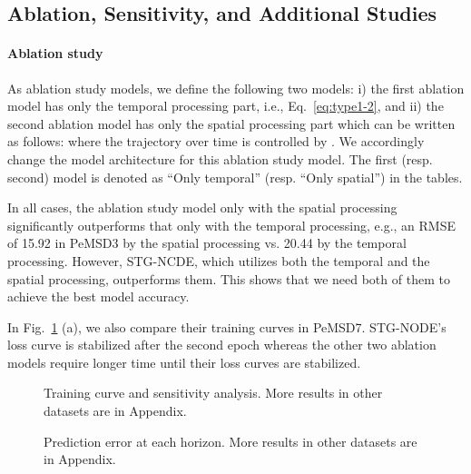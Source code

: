 \documentclass[letterpaper]{article} \usepackage{aaai22}  \usepackage{times}  \usepackage{helvet}  \usepackage{courier}  \usepackage[hyphens]{url}  \usepackage{graphicx} \urlstyle{rm} \def\UrlFont{\rm}  \usepackage{natbib}  \usepackage{caption} \DeclareCaptionStyle{ruled}{labelfont=normalfont,labelsep=colon,strut=off} \frenchspacing  \setlength{\pdfpagewidth}{8.5in}  \setlength{\pdfpageheight}{11in}  \usepackage{stfloats}
\begin{document}
\subsection{Ablation, Sensitivity, and Additional Studies}\label{sec:abl}
\paragraph{Ablation study} As ablation study models, we define the following two models: i) the first ablation model has only the temporal processing part, i.e., Eq.~\eqref{eq:type1-2}, and ii) the second ablation model has only the spatial processing part which can be written as follows:
where the trajectory  over time is controlled by . We accordingly change the model architecture for this ablation study model. The first (resp. second) model is denoted as ``Only temporal'' (resp. ``Only spatial'') in the tables.

In all cases, the ablation study model only with the spatial processing significantly outperforms that only with the temporal processing, e.g., an RMSE of 15.92 in PeMSD3 by the spatial processing vs. 20.44 by the temporal processing. However, STG-NCDE, which utilizes both the temporal and the spatial processing, outperforms them. This shows that we need both of them to achieve the best model accuracy.

In Fig.~\ref{fig:loss_pemsd7} (a), we also compare their training curves in PeMSD7. STG-NODE's loss curve is stabilized after the second epoch whereas the other two ablation models require longer time until their loss curves are stabilized.

\begin{figure}[!t]
    \centering
    \caption{Training curve and sensitivity analysis. More results in other datasets are in Appendix.}
    \label{fig:loss_pemsd7}
\end{figure}

\begin{figure}[!t]
    \centering
    \caption{Prediction error at each horizon. More results in other datasets are in Appendix.}
    \label{fig:horizon}
\end{figure}
\end{document}
